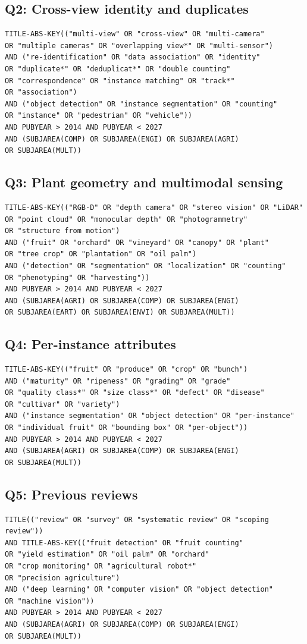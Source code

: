 \subsection*{Q2: Cross-view identity and duplicates}
\begin{verbatim}
TITLE-ABS-KEY(("multi-view" OR "cross-view" OR "multi-camera"
OR "multiple cameras" OR "overlapping view*" OR "multi-sensor")
AND ("re-identification" OR "data association" OR "identity"
OR "duplicate*" OR "deduplicat*" OR "double counting"
OR "correspondence" OR "instance matching" OR "track*"
OR "association")
AND ("object detection" OR "instance segmentation" OR "counting"
OR "instance" OR "pedestrian" OR "vehicle"))
AND PUBYEAR > 2014 AND PUBYEAR < 2027
AND (SUBJAREA(COMP) OR SUBJAREA(ENGI) OR SUBJAREA(AGRI)
OR SUBJAREA(MULT))
\end{verbatim}

\subsection*{Q3: Plant geometry and multimodal sensing}
\begin{verbatim}
TITLE-ABS-KEY(("RGB-D" OR "depth camera" OR "stereo vision" OR "LiDAR"
OR "point cloud" OR "monocular depth" OR "photogrammetry"
OR "structure from motion")
AND ("fruit" OR "orchard" OR "vineyard" OR "canopy" OR "plant"
OR "tree crop" OR "plantation" OR "oil palm")
AND ("detection" OR "segmentation" OR "localization" OR "counting"
OR "phenotyping" OR "harvesting"))
AND PUBYEAR > 2014 AND PUBYEAR < 2027
AND (SUBJAREA(AGRI) OR SUBJAREA(COMP) OR SUBJAREA(ENGI)
OR SUBJAREA(EART) OR SUBJAREA(ENVI) OR SUBJAREA(MULT))
\end{verbatim}

\subsection*{Q4: Per-instance attributes}
\begin{verbatim}
TITLE-ABS-KEY(("fruit" OR "produce" OR "crop" OR "bunch")
AND ("maturity" OR "ripeness" OR "grading" OR "grade"
OR "quality class*" OR "size class*" OR "defect" OR "disease"
OR "cultivar" OR "variety")
AND ("instance segmentation" OR "object detection" OR "per-instance"
OR "individual fruit" OR "bounding box" OR "per-object"))
AND PUBYEAR > 2014 AND PUBYEAR < 2027
AND (SUBJAREA(AGRI) OR SUBJAREA(COMP) OR SUBJAREA(ENGI)
OR SUBJAREA(MULT))
\end{verbatim}

\subsection*{Q5: Previous reviews}
\begin{verbatim}
TITLE(("review" OR "survey" OR "systematic review" OR "scoping review"))
AND TITLE-ABS-KEY(("fruit detection" OR "fruit counting"
OR "yield estimation" OR "oil palm" OR "orchard"
OR "crop monitoring" OR "agricultural robot*"
OR "precision agriculture")
AND ("deep learning" OR "computer vision" OR "object detection"
OR "machine vision"))
AND PUBYEAR > 2014 AND PUBYEAR < 2027
AND (SUBJAREA(AGRI) OR SUBJAREA(COMP) OR SUBJAREA(ENGI)
OR SUBJAREA(MULT))
\end{verbatim}

